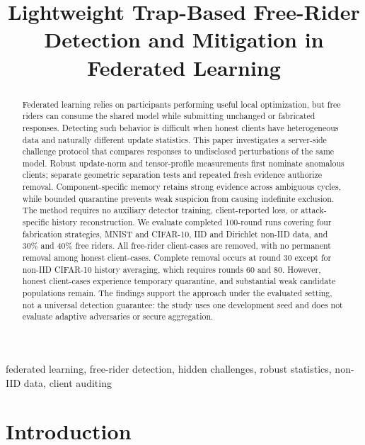\documentclass[conference]{IEEEtran}
\title{Lightweight Trap-Based Free-Rider Detection and Mitigation in Federated Learning}
\author{\IEEEauthorblockN{Aashnan Rahman}
\IEEEauthorblockA{Department of Computer Science and Engineering\\
Islamic University of Technology\\MSc Thesis}}
\begin{document}
\maketitle
{}

\begin{abstract}
Federated learning relies on participants performing useful local optimization,
but free riders can consume the shared model while submitting unchanged or
fabricated responses. Detecting such behavior is difficult when honest clients
have heterogeneous data and naturally different update statistics. This paper
investigates a server-side challenge protocol that compares responses to
undisclosed perturbations of the same model. Robust update-norm and tensor-profile
measurements first nominate anomalous clients; separate geometric separation
tests and repeated fresh evidence authorize removal. Component-specific memory
retains strong evidence across ambiguous cycles, while bounded quarantine
prevents weak suspicion from causing indefinite exclusion. The method requires
no auxiliary detector training, client-reported loss, or attack-specific history
reconstruction. We evaluate \StudyRuns{} completed 100-round runs covering four
fabrication strategies, MNIST and CIFAR-10, IID and Dirichlet non-IID data, and
30\% and 40\% free riders. All \StudyTP{} free-rider client-cases are removed,
with no permanent removal among \StudyHonest{} honest client-cases. Complete
removal occurs at round 30 except for non-IID CIFAR-10 history averaging, which
requires rounds 60 and 80. However, \StudyQuarantined{} honest client-cases
experience temporary quarantine, and substantial weak candidate populations
remain. The findings support the approach under the evaluated setting, not a
universal detection guarantee: the study uses one development seed and does not
evaluate adaptive adversaries or secure aggregation.
\end{abstract}
\begin{IEEEkeywords}
federated learning, free-rider detection, hidden challenges, robust statistics,
non-IID data, client auditing
\end{IEEEkeywords}

\section{Introduction}
\end{document}

